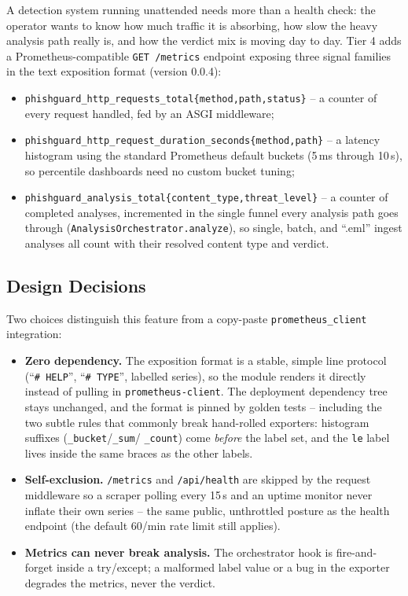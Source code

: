 A detection system running unattended needs more than a health check:
the operator wants to know how much traffic it is absorbing, how slow
the heavy analysis path really is, and how the verdict mix is moving
day to day.  Tier 4 adds a Prometheus-compatible
\texttt{GET \hspace{0pt}/metrics} endpoint exposing three
signal families in the text exposition format (version 0.0.4):

\begin{itemize}
\item
  \texttt{phishguard\_http\_requests\_total\{method,path,status\}} --
  a counter of every request handled, fed by an ASGI middleware;
\item
  \texttt{phishguard\_http\_request\_duration\_seconds\{method,path\}}
  -- a latency histogram using the standard Prometheus default
  buckets (5\,ms through 10\,s), so percentile dashboards need no
  custom bucket tuning;
\item
  \texttt{phishguard\_analysis\_total\{content\_type,threat\_level\}}
  -- a counter of completed analyses, incremented in the single
  funnel every analysis path goes through
  (\texttt{AnalysisOrchestrator.analyze}), so single, batch, and
  ``.eml'' ingest analyses all count with their resolved content type
  and verdict.
\end{itemize}

\subsection{Design Decisions}

Two choices distinguish this feature from a copy-paste
\texttt{prometheus\_client} integration:

\begin{itemize}
\item
  \textbf{Zero dependency.}  The exposition format is a stable,
  simple line protocol (``\texttt{\# HELP}'', ``\texttt{\# TYPE}'',
  labelled series), so the module renders it directly instead of
  pulling in \texttt{prometheus-client}.  The deployment dependency
  tree stays unchanged, and the format is pinned by golden tests --
  including the two subtle rules that commonly break hand-rolled
  exporters: histogram suffixes (\texttt{\_bucket}/\texttt{\_sum}/
  \texttt{\_count}) come \emph{before} the label set, and the
  \texttt{le} label lives inside the same braces as the other labels.
\item
  \textbf{Self-exclusion.}  \texttt{/metrics} and \texttt{/api/health}
  are skipped by the request middleware so a scraper polling every
  15\,s and an uptime monitor never inflate their own series -- the
  same public, unthrottled posture as the health endpoint (the
  default 60/min rate limit still applies).
\item
  \textbf{Metrics can never break analysis.}  The orchestrator hook
  is fire-and-forget inside a try/except; a malformed label value or
  a bug in the exporter degrades the metrics, never the verdict.
\end{itemize}

